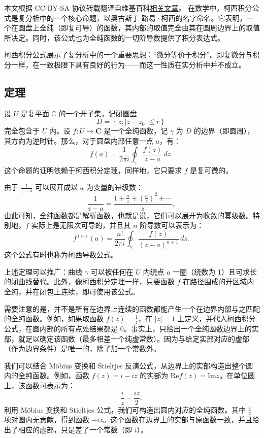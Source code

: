 
本文根据 CC-BY-SA 协议转载翻译自维基百科\href{https://en.wikipedia.org/wiki/Cauchy\%27s_integral_formula}{相关文章}。
在数学中，柯西积分公式是复分析中的一个核心命题，以奥古斯丁-路易·柯西的名字命名。它表明，一个在圆盘上全纯（即复可导）的函数，其内部的取值完全由其在圆周边界上的取值所决定。同时，该公式也为全纯函数的一切阶导数提供了积分表达式。

柯西积分公式展示了复分析中的一个重要思想：“微分等价于积分”。即复微分与积分一样，在一致极限下具有良好的行为——而这一性质在实分析中并不成立。
\subsection{定理}
设 $U$ 是复平面 $\mathbb{C}$ 的一个开子集，记闭圆盘
$$
D = \left\{ z : |z - z_0| \leq r \right\}~
$$
完全包含于 $U$ 内。设 $f: U \to \mathbf{C}$ 是一个全纯函数，记 $\gamma$ 为 $D$ 的边界（即圆周），其方向为逆时针。那么，对于圆盘内部任意一点 $a$，有：
$$
f(a) = \frac{1}{2\pi i} \oint_{\gamma} \frac{f(z)}{z - a} \, dz.~
$$
这个命题的证明依赖于柯西积分定理，同样地，它只要求 $f$ 是复可微的。

由于 $\frac{1}{z - a}$ 可以展开成以 $a$ 为变量的幂级数：
$$
\frac{1}{z - a} = \frac{1 + \frac{a}{z} + \left( \frac{a}{z} \right)^2 + \cdots}{z}  ,~
$$
由此可知，全纯函数都是解析函数，也就是说，它们可以展开为收敛的幂级数。特别地，$f$ 实际上是无限次可导的，并且其 $n$ 阶导数可以表示为：
$$
f^{(n)}(a) = \frac{n!}{2\pi i} \oint_{\gamma} \frac{f(z)}{(z - a)^{n+1}} \, dz.~
$$
这个公式有时也称为柯西导数公式。

上述定理可以推广：曲线 $\gamma$ 可以被任何在 $U$ 内绕点 $a$ 一圈（绕数为 1）且可求长的闭曲线替代。此外，像柯西积分定理一样，只要函数 $f$ 在路径围成的开区域内全纯，并在闭包上连续，即可使用该公式。

需要注意的是，并不是所有在边界上连续的函数都能产生一个在边界内部与之匹配的全纯函数。例如，如果取函数 $f(z) = \frac{1}{z}$，在 $|z| = 1$ 上定义，并代入柯西积分公式，在圆内部的所有点处结果都是 0。事实上，只给出一个全纯函数边界上的实部，就足以确定该函数（最多相差一个纯虚常数）。因为与给定实部对应的虚部（作为边界条件）是唯一的，除了加一个常数外。

我们可以结合 Möbius 变换和 Stieltjes 反演公式，从边界上的实部构造出整个圆内的全纯函数。例如，函数 $f(z) = i - iz$ 的实部为 $\text{Re} f(z) = \text{Im} z$。在单位圆上，该函数可表示为：
$$
\frac{i}{z} - \frac{iz}{2}.~
$$
利用 Möbius 变换和 Stieltjes 公式，我们可构造出圆内对应的全纯函数。其中 $\frac{i}{z}$ 项对圆内无贡献，得到函数 $-iz$。这个函数在边界上的实部与原函数一致，并且给出了相应的虚部，只是差了一个常数（即 $i$）。
